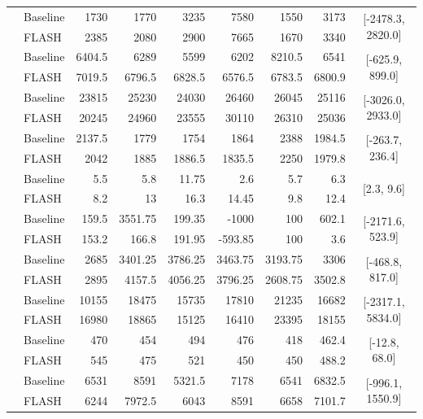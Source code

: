 \documentclass{article} %
\begin{document}
\begin{table}[H]
{\begin{tabular}{@{}ll*{5}{r}rc@{}}
\addlinespace[1pt]
\multirow{2}{*}{Kangaroo} & Baseline & 1730 & 1770 & 3235 & 7580 & 1550 & 3173 & \multirow{2}{*}{[-2478.3, 2820.0]} \\
 & FLASH & 2385 & 2080 & 2900 & 7665 & 1670 & 3340 &  \\
\addlinespace[1pt]
\multirow{2}{*}{Krull} & Baseline & 6404.5 & 6289 & 5599 & 6202 & 8210.5 & 6541 & \multirow{2}{*}{[-625.9, 899.0]} \\
 & FLASH & 7019.5 & 6796.5 & 6828.5 & 6576.5 & 6783.5 & 6800.9 &  \\
\addlinespace[1pt]
\multirow{2}{*}{KungFuMaster} & Baseline & 23815 & 25230 & 24030 & 26460 & 26045 & 25116 & \multirow{2}{*}{[-3026.0, 2933.0]} \\
 & FLASH & 20245 & 24960 & 23555 & 30110 & 26310 & 25036 &  \\
\addlinespace[1pt]
\multirow{2}{*}{MsPacman} & Baseline & 2137.5 & 1779 & 1754 & 1864 & 2388 & 1984.5 & \multirow{2}{*}{[-263.7, 236.4]} \\
 & FLASH & 2042 & 1885 & 1886.5 & 1835.5 & 2250 & 1979.8 &  \\
\addlinespace[1pt]
\multirow{2}{*}{Pong} & Baseline & 5.5 & 5.8 & 11.75 & 2.6 & 5.7 & 6.3 & \multirow{2}{*}{[2.3, 9.6]} \\
 & FLASH & 8.2 & 13 & 16.3 & 14.45 & 9.8 & 12.4 &  \\
\addlinespace[1pt]
\multirow{2}{*}{PrivateEye} & Baseline & 159.5 & 3551.75 & 199.35 & -1000 & 100 & 602.1 & \multirow{2}{*}{[-2171.6, 523.9]} \\
 & FLASH & 153.2 & 166.8 & 191.95 & -593.85 & 100 & 3.6 &  \\
\addlinespace[1pt]
\multirow{2}{*}{Qbert} & Baseline & 2685 & 3401.25 & 3786.25 & 3463.75 & 3193.75 & 3306 & \multirow{2}{*}{[-468.8, 817.0]} \\
 & FLASH & 2895 & 4157.5 & 4056.25 & 3796.25 & 2608.75 & 3502.8 &  \\
\addlinespace[1pt]
\multirow{2}{*}{RoadRunner} & Baseline & 10155 & 18475 & 15735 & 17810 & 21235 & 16682 & \multirow{2}{*}{[-2317.1, 5834.0]} \\
 & FLASH & 16980 & 18865 & 15125 & 16410 & 23395 & 18155 &  \\
\addlinespace[1pt]
\multirow{2}{*}{Seaquest} & Baseline & 470 & 454 & 494 & 476 & 418 & 462.4 & \multirow{2}{*}{[-12.8, 68.0]} \\
 & FLASH & 545 & 475 & 521 & 450 & 450 & 488.2 &  \\
\addlinespace[1pt]
\multirow{2}{*}{UpNDown} & Baseline & 6531 & 8591 & 5321.5 & 7178 & 6541 & 6832.5 & \multirow{2}{*}{[-996.1, 1550.9]} \\
 & FLASH & 6244 & 7972.5 & 6043 & 8591 & 6658 & 7101.7 &  \\
\bottomrule
\end{tabular}
}
\end{table}
\end{document}
